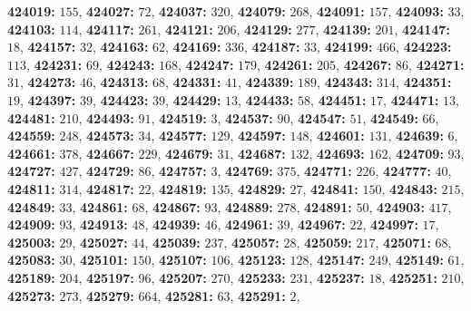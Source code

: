 \textsf{\bfseries 424019:} $155$, \textsf{\bfseries 424027:} $72$, \textsf{\bfseries 424037:} $320$, \textsf{\bfseries 424079:} $268$, \textsf{\bfseries 424091:} $157$, \textsf{\bfseries 424093:} $33$, \textsf{\bfseries 424103:} $114$, \textsf{\bfseries 424117:} $261$, \textsf{\bfseries 424121:} $206$, \textsf{\bfseries 424129:} $277$, \textsf{\bfseries 424139:} $201$, \textsf{\bfseries 424147:} $18$, \textsf{\bfseries 424157:} $32$, \textsf{\bfseries 424163:} $62$, \textsf{\bfseries 424169:} $336$, \textsf{\bfseries 424187:} $33$, \textsf{\bfseries 424199:} $466$, \textsf{\bfseries 424223:} $113$, \textsf{\bfseries 424231:} $69$, \textsf{\bfseries 424243:} $168$, \textsf{\bfseries 424247:} $179$, \textsf{\bfseries 424261:} $205$, \textsf{\bfseries 424267:} $86$, \textsf{\bfseries 424271:} $31$, \textsf{\bfseries 424273:} $46$, \textsf{\bfseries 424313:} $68$, \textsf{\bfseries 424331:} $41$, \textsf{\bfseries 424339:} $189$, \textsf{\bfseries 424343:} $314$, \textsf{\bfseries 424351:} $19$, \textsf{\bfseries 424397:} $39$, \textsf{\bfseries 424423:} $39$, \textsf{\bfseries 424429:} $13$, \textsf{\bfseries 424433:} $58$, \textsf{\bfseries 424451:} $17$, \textsf{\bfseries 424471:} $13$, \textsf{\bfseries 424481:} $210$, \textsf{\bfseries 424493:} $91$, \textsf{\bfseries 424519:} $3$, \textsf{\bfseries 424537:} $90$, \textsf{\bfseries 424547:} $51$, \textsf{\bfseries 424549:} $66$, \textsf{\bfseries 424559:} $248$, \textsf{\bfseries 424573:} $34$, \textsf{\bfseries 424577:} $129$, \textsf{\bfseries 424597:} $148$, \textsf{\bfseries 424601:} $131$, \textsf{\bfseries 424639:} $6$, \textsf{\bfseries 424661:} $378$, \textsf{\bfseries 424667:} $229$, \textsf{\bfseries 424679:} $31$, \textsf{\bfseries 424687:} $132$, \textsf{\bfseries 424693:} $162$, \textsf{\bfseries 424709:} $93$, \textsf{\bfseries 424727:} $427$, \textsf{\bfseries 424729:} $86$, \textsf{\bfseries 424757:} $3$, \textsf{\bfseries 424769:} $375$, \textsf{\bfseries 424771:} $226$, \textsf{\bfseries 424777:} $40$, \textsf{\bfseries 424811:} $314$, \textsf{\bfseries 424817:} $22$, \textsf{\bfseries 424819:} $135$, \textsf{\bfseries 424829:} $27$, \textsf{\bfseries 424841:} $150$, \textsf{\bfseries 424843:} $215$, \textsf{\bfseries 424849:} $33$, \textsf{\bfseries 424861:} $68$, \textsf{\bfseries 424867:} $93$, \textsf{\bfseries 424889:} $278$, \textsf{\bfseries 424891:} $50$, \textsf{\bfseries 424903:} $417$, \textsf{\bfseries 424909:} $93$, \textsf{\bfseries 424913:} $48$, \textsf{\bfseries 424939:} $46$, \textsf{\bfseries 424961:} $39$, \textsf{\bfseries 424967:} $22$, \textsf{\bfseries 424997:} $17$, \textsf{\bfseries 425003:} $29$, \textsf{\bfseries 425027:} $44$, \textsf{\bfseries 425039:} $237$, \textsf{\bfseries 425057:} $28$, \textsf{\bfseries 425059:} $217$, \textsf{\bfseries 425071:} $68$, \textsf{\bfseries 425083:} $30$, \textsf{\bfseries 425101:} $150$, \textsf{\bfseries 425107:} $106$, \textsf{\bfseries 425123:} $128$, \textsf{\bfseries 425147:} $249$, \textsf{\bfseries 425149:} $61$, \textsf{\bfseries 425189:} $204$, \textsf{\bfseries 425197:} $96$, \textsf{\bfseries 425207:} $270$, \textsf{\bfseries 425233:} $231$, \textsf{\bfseries 425237:} $18$, \textsf{\bfseries 425251:} $210$, \textsf{\bfseries 425273:} $273$, \textsf{\bfseries 425279:} $664$, \textsf{\bfseries 425281:} $63$, \textsf{\bfseries 425291:} $2$, 

